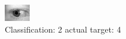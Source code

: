 \begin{figure}[h!]
\begin{center}
\includegraphics[width=0.60\columnwidth]{figures/ID778_class_2_target_4.png}
\end{center}
\caption{ Classification: 2 actual target: 4}
\label{fig:ID778_class_2_target_4}
\end{figure}
